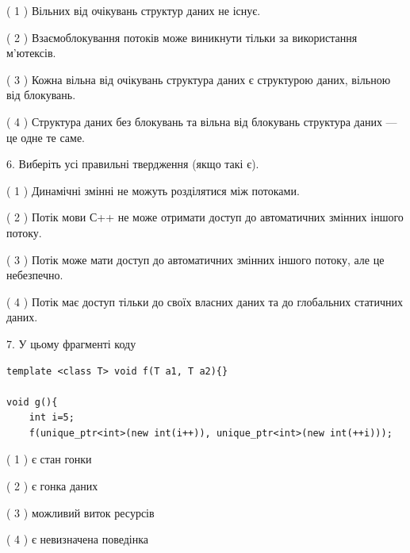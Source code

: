 \documentclass[12pt, ukrainian]{article}
\begin{document}
\begin {large}
{( 1 ) Вільних від очікувань структур даних не існує.%

( 2 ) Взаємоблокування потоків може виникнути тільки за використання м’ютексів.%

( 3 ) Кожна вільна від очікувань структура даних є структурою даних, вільною від блокувань.%

( 4 ) Структура даних без блокувань та вільна від блокувань структура даних --- це одне те саме.%
\newpage



\vspace{5mm}
6. Виберіть усі правильні твердження (якщо такі є).\par
\vspace{2mm}

( 1 ) Динамічні змінні не можуть розділятися між потоками.%

( 2 ) Потік мови С++ не може отримати доступ до автоматичних змінних іншого потоку.%

( 3 ) Потік може мати доступ до автоматичних змінних іншого потоку, але це небезпечно.%

( 4 ) Потік має доступ тільки до своїх власних даних та до глобальних статичних даних.%


\vspace{5mm}
7. У цьому фрагменті коду
\begin{verbatim}
template <class T> void f(T a1, T a2){}

void g(){
    int i=5;
    f(unique_ptr<int>(new int(i++)), unique_ptr<int>(new int(++i)));
\end{verbatim}

( 1 ) є стан гонки%

( 2 ) є гонка даних%

( 3 ) можливий виток ресурсів%

( 4 ) є невизначена поведінка%
}
\end {large}
\end{document}
